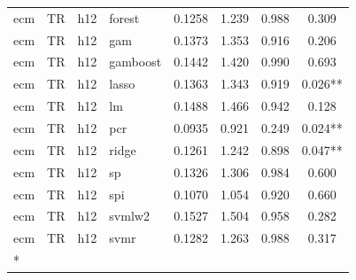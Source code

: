 \begin{ThreePartTable}
\begin{longtable}[t]{llclcccc}
ecm & TR & h12 & forest & 0.1258 & 1.239 & 0.988 & 0.309\\
ecm & TR & h12 & gam & 0.1373 & 1.353 & 0.916 & 0.206\\
ecm & TR & h12 & gamboost & 0.1442 & 1.420 & 0.990 & 0.693\\
ecm & TR & h12 & lasso & 0.1363 & 1.343 & 0.919 & 0.026**\\
ecm & TR & h12 & lm & 0.1488 & 1.466 & 0.942 & 0.128\\
ecm & TR & h12 & pcr & 0.0935 & 0.921 & 0.249 & 0.024**\\
ecm & TR & h12 & ridge & 0.1261 & 1.242 & 0.898 & 0.047**\\
ecm & TR & h12 & sp & 0.1326 & 1.306 & 0.984 & 0.600\\
ecm & TR & h12 & spi & 0.1070 & 1.054 & 0.920 & 0.660\\
ecm & TR & h12 & svmlw2 & 0.1527 & 1.504 & 0.958 & 0.282\\
ecm & TR & h12 & svmr & 0.1282 & 1.263 & 0.988 & 0.317\\*
\end{longtable}
\end{ThreePartTable}
\endgroup{}
